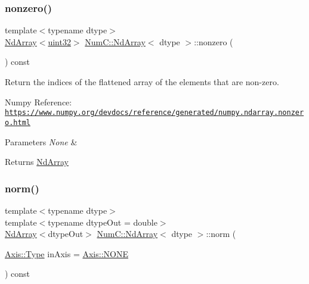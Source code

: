 \subsubsection{\texorpdfstring{nonzero()}{nonzero()}}
{\footnotesize\ttfamily template$<$typename dtype$>$ \\
\mbox{\hyperlink{class_num_c_1_1_nd_array}{Nd\+Array}}$<$\mbox{\hyperlink{namespace_num_c_ae685802ca6d3035f2b400b081e3953fa}{uint32}}$>$ \mbox{\hyperlink{class_num_c_1_1_nd_array}{Num\+C\+::\+Nd\+Array}}$<$ dtype $>$\+::nonzero (\begin{DoxyParamCaption}{ }\end{DoxyParamCaption}) const\hspace{0.3cm}{\ttfamily [inline]}}

Return the indices of the flattened array of the elements that are non-\/zero.

Numpy Reference\+: \href{https://www.numpy.org/devdocs/reference/generated/numpy.ndarray.nonzero.html}{\tt https\+://www.\+numpy.\+org/devdocs/reference/generated/numpy.\+ndarray.\+nonzero.\+html}


\begin{DoxyParams}{Parameters}
{\em None} & \\
\hline
\end{DoxyParams}
\begin{DoxyReturn}{Returns}
\mbox{\hyperlink{class_num_c_1_1_nd_array}{Nd\+Array}} 
\end{DoxyReturn}
\mbox{\label{class_num_c_1_1_nd_array_a47c3cf20b6d6c9836c8f44cd20db19a2}} 
\subsubsection{\texorpdfstring{norm()}{norm()}}
{\footnotesize\ttfamily template$<$typename dtype$>$ \\
template$<$typename dtype\+Out  = double$>$ \\
\mbox{\hyperlink{class_num_c_1_1_nd_array}{Nd\+Array}}$<$dtype\+Out$>$ \mbox{\hyperlink{class_num_c_1_1_nd_array}{Num\+C\+::\+Nd\+Array}}$<$ dtype $>$\+::norm (\begin{DoxyParamCaption}\item[{\mbox{\hyperlink{struct_num_c_1_1_axis_a8e689044ef1941a03482e730c5e7ebb3}{Axis\+::\+Type}}}]{in\+Axis = {\ttfamily \mbox{\hyperlink{struct_num_c_1_1_axis_a8e689044ef1941a03482e730c5e7ebb3a0ae033c4226f7184bf0050b101e7ed94}{Axis\+::\+N\+O\+NE}}} }\end{DoxyParamCaption}) const\hspace{0.3cm}{\ttfamily [inline]}}

